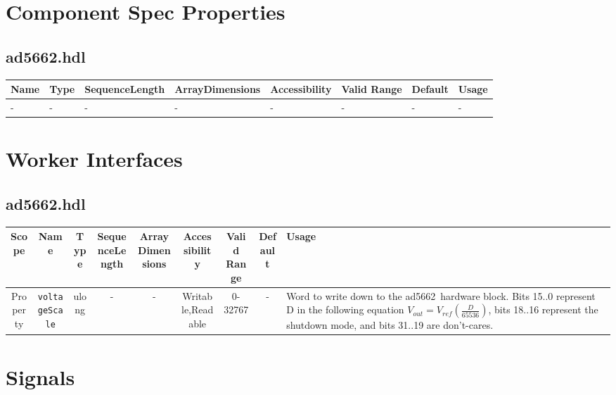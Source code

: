 \documentclass{article}
\def\comp{ad5662}
\begin{document}
\begin{landscape}
\section*{Component Spec Properties}
	\subsection*{\comp.hdl}
    \begin{scriptsize}
    	\begin{tabular}{|p{3.75cm}|p{1.25cm}|p{2cm}|p{2.75cm}|p{1.5cm}|p{1.5cm}|p{1cm}|p{6.23cm}|}
        \hline
        \rowcolor{blue}
        Name & Type & SequenceLength & ArrayDimensions & Accessibility & Valid Range & Default & Usage \\
        \hline
        - & - & - & - & - & - & - & - \\
        \hline
        \end{tabular}
    \end{scriptsize}

\section*{Worker Interfaces}
	\subsection*{\comp.hdl}
	\begin{scriptsize}
		\begin{tabular}{|c|c|c|c|c|c|c|c|p{8.5cm}|}
			\hline
			\rowcolor{blue}
			Scope        & Name                 & Type  & SequenceLength & ArrayDimensions & Accessibility     & Valid Range & Default & Usage \\
			\hline
			Property     & \verb+voltageScale+  & ulong & -              & -               & Writable,Readable & 0-32767     & -       & Word to write down to the \comp\ hardware block. Bits 15..0 represent D in the following equation \(V_{out}=V_{ref} (\frac{D}{65536})\), bits 18..16 represent the shutdown mode, and bits 31..19 are don't-cares.    \\
			\hline
		\end{tabular}
	\end{scriptsize}

\section*{Signals}

\end{landscape}
\end{document}
